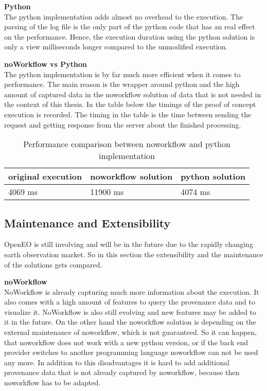 \documentclass[draft,final]{vutinfth} %
\begin{document}
\textbf{Python} \\
The python implementation adds almost no overhead to the execution. The parsing of the log file is the only part of the python code that has an real effect on the performance. Hence, the execution duration using the python solution is only a view milliseconds longer compared to the unmodified execution.  

\textbf{noWorkflow vs Python} \\
The python implementation is by far much more efficient when it comes to performance. The main reason is the wrapper around python and the high amount of captured data in the noworkflow solution of data that is not needed in the context of this thesis. In the table below the timings of the proof of concept execution is recorded. The timing in the table is the time between sending the request and getting response from the server about the finished processing. 

\begin{table}[]
	\caption{Performance comparison between noworkflow and python implementation}
	\centering
	\begin{tabular}{l|l|l}
		\textbf{original execution} & \textbf{noworkflow solution} & \textbf{python solution} \\ \hline
		4069 ms & 11900 ms & 4074 ms \\ 
	\end{tabular}
	\label{Tab:noworkflow}
\end{table}

\subsection{Maintenance and Extensibility}\label{NvsP:Maintenance and Extensibility}
OpenEO is still involving and will be in the future due to the rapidly changing earth observation market. So in this section the extensibility and the maintenance of the solutions gets compared. 

\textbf{noWorkflow} \\
NoWorkflow is already capturing much more information about the execution. It also comes with a high amount of features to query the provenance data and to visualize it. NoWorkflow is also still evolving and new features may be added to it in the future. On the other hand the noworkflow solution is depending on the external maintenance of noworkflow, which is not guaranteed. So it can happen, that noworkflow does not work with a new python version, or if the back end provider switches to another programming language noworkflow can not be used any more. In addition to this disadvantages it is hard to add additional provenance data that is not already captured by noworkflow, because then noworkflow has to be adapted.
\end{document}
